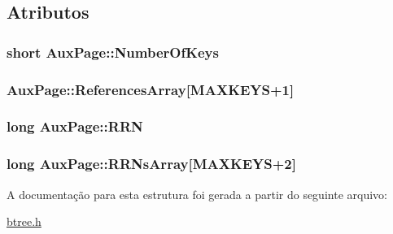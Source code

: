 \subsection{Atributos}
\hypertarget{structAuxPage_ac9f519148aaa753921e25d01c6bc0e80}{
\subsubsection[{Number\-Of\-Keys}]{\setlength{\rightskip}{0pt plus 5cm}short Aux\-Page\-::\-Number\-Of\-Keys}}\label{structAuxPage_ac9f519148aaa753921e25d01c6bc0e80}
\hypertarget{structAuxPage_a4c8858a412fbbc13c243b534ed5df578}{
\subsubsection[{References\-Array}]{ Aux\-Page\-::\-References\-Array\mbox{[}{\bf M\-A\-X\-K\-E\-Y\-S}+1\mbox{]}}}\label{structAuxPage_a4c8858a412fbbc13c243b534ed5df578}
\hypertarget{structAuxPage_a01fea01ef3c426f72cc6ebf975edc422}{
\subsubsection[{R\-R\-N}]{\setlength{\rightskip}{0pt plus 5cm}long Aux\-Page\-::\-R\-R\-N}}\label{structAuxPage_a01fea01ef3c426f72cc6ebf975edc422}
\hypertarget{structAuxPage_adaaea5853a03f800b065b19c95d49717}{
\subsubsection[{R\-R\-Ns\-Array}]{\setlength{\rightskip}{0pt plus 5cm}long Aux\-Page\-::\-R\-R\-Ns\-Array\mbox{[}{\bf M\-A\-X\-K\-E\-Y\-S}+2\mbox{]}}}\label{structAuxPage_adaaea5853a03f800b065b19c95d49717}


A documentação para esta estrutura foi gerada a partir do seguinte arquivo\-:\begin{DoxyCompactItemize}
\item 
\hyperlink{btree_8h}{btree.\-h}\end{DoxyCompactItemize}
